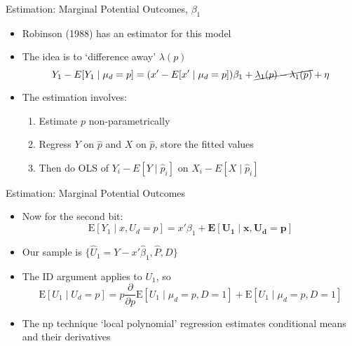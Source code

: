 \documentclass{beamer}
\begin{document}
\begin{frame}{Estimation:  Marginal Potential Outcomes, $\beta_1$}
  \begin{itemize}
  \item Robinson (1988) has an estimator for this model
\item The idea is to
  `difference away' $\lambda(p)$
  \begin{equation*}
Y_1 - E[Y_1\mid \mu_d=p] = (x'-E[x'\mid \mu_d=p])\beta_1 +  \cancel{\lambda_1(p) - \lambda_1(p)} + \eta
\end{equation*} \pause
\item The estimation involves:
\begin{enumerate}
\item Estimate ${p}$ non-parametrically
\item Regress $Y$ on $\hat{p}$ and $X$ on $\hat{p}$, store the fitted values
\item Then do OLS of $Y_i - E[Y\mid \hat{p}_i]$ on $X_i -
   E[X\mid \hat{p}_i]$
\end{enumerate}
  \end{itemize}

\end{frame}

\begin{frame}{Estimation:  Marginal Potential Outcomes }
  \begin{itemize}
  \item Now for the second bit: \begin{equation*}
      \mathrm{E}[Y_1\mid x,U_d=p]  = x'\beta_1 +  \mathbf{\mathrm{\mathbf{E}}[U_1\mid x,U_d=p]}
    \end{equation*} \pause
\item Our sample is $\{\hat{U}_1= Y-x'\hat{\beta}_1, \hat{P},
  D\}$
\item The ID argument applies to $U_1$, so
\begin{equation*}
  \mathrm{E}[U_1\mid U_d= p] = p \frac{\partial}{\partial
    p}\mathrm{E}[U_1\mid \mu_d=p,D=1] + \mathrm{E}[U_1\mid \mu_d=p,D=1]
\end{equation*} \pause
\item The np technique `local polynomial' regression estimates conditional means and their derivatives
  \end{itemize}

\end{frame}
\end{document}
